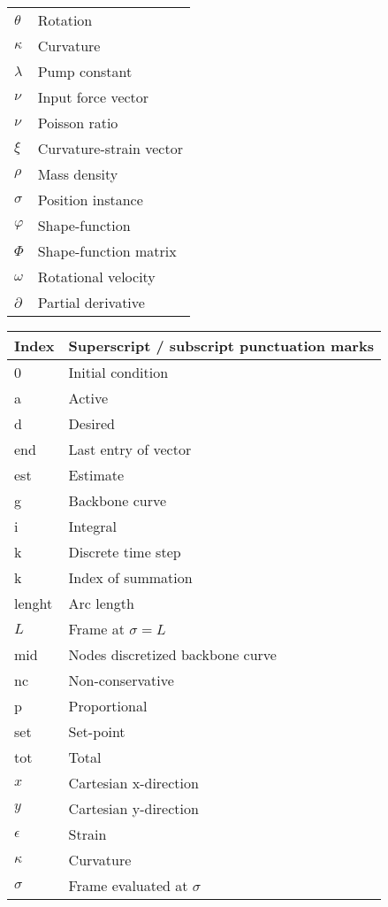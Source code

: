 \begin{spacing}{0.9}
\begin{multicols}{2}
\begin{table}[H]
\begin{tabular}{p{2.8cm} p{3.2cm}}
    $\theta$      & Rotation \\
    $\kappa$     &  Curvature \\
    $\lambda$    &  Pump constant \\
    $\nu$     &  Input force vector \\
    $\nu$     &  Poisson ratio \\
    $\xi$     &  Curvature-strain vector \\
    $\rho$     &  Mass density \\
    $\sigma$     &  Position instance \\
    $\varphi$     &  Shape-function \\
    $\Phi$    &  Shape-function matrix \\
    $\omega$     &  Rotational velocity \\
    $\partial$     &  Partial derivative \\ \hline
    
    \end{tabular}
\end{table}


\begin{table}[H]
\centering
    \begin{tabular}{p{1.5cm} p{5cm}} \hline
    \textbf{Index}    &   \textbf{Superscript / subscript punctuation marks}\\ \hline
    0     &  Initial condition \\
    a     &  Active \\
    d     &  Desired \\
    end   & Last entry of vector \\
    est   & Estimate \\
    g     & Backbone curve \\
    i     & Integral \\
    k     & Discrete time step \\
    k     & Index of summation \\
    lenght & Arc length \\
    $L$   & Frame at $\sigma = L$ \\
    mid    & Nodes discretized backbone curve \\
    nc    & Non-conservative \\
    p    & Proportional \\
    set   & Set-point \\
    tot    & Total \\
    $x$    & Cartesian x-direction \\
    $y$    & Cartesian y-direction \\
    $\epsilon$  & Strain \\
    $\kappa$ & Curvature \\ 
    $\sigma$   & Frame evaluated at $\sigma$ \\\hline
    \end{tabular}
\end{table}







\end{multicols}
\end{spacing}
